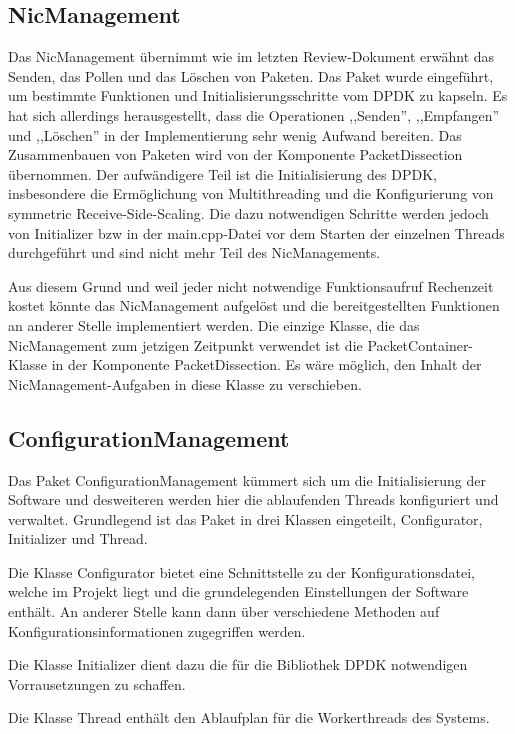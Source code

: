 \documentclass[../review_2.tex]{subfiles}
\begin{document}
\subsection{NicManagement}
Das NicManagement übernimmt wie im letzten Review-Dokument erwähnt das Senden, das Pollen und das Löschen von Paketen. Das Paket wurde eingeführt, um bestimmte Funktionen und Initialisierungsschritte vom DPDK zu kapseln. Es hat sich allerdings herausgestellt, dass die Operationen ,,Senden'', ,,Empfangen'' und ,,Löschen'' in der Implementierung sehr wenig Aufwand bereiten. Das Zusammenbauen von Paketen wird von der Komponente PacketDissection übernommen. Der aufwändigere Teil ist die Initialisierung des DPDK, insbesondere die Ermöglichung von Multithreading und die Konfigurierung von symmetric Receive-Side-Scaling. Die dazu notwendigen Schritte werden jedoch von Initializer bzw in der main.cpp-Datei vor dem Starten der einzelnen Threads durchgeführt und sind nicht mehr Teil des NicManagements.

Aus diesem Grund und weil jeder nicht notwendige Funktionsaufruf Rechenzeit kostet könnte das NicManagement aufgelöst und die bereitgestellten Funktionen an anderer Stelle implementiert werden. Die einzige Klasse, die das NicManagement zum jetzigen Zeitpunkt verwendet ist die PacketContainer-Klasse in der Komponente PacketDissection. Es wäre möglich, den Inhalt der NicManagement-Aufgaben in diese Klasse zu verschieben.


\subsection{ConfigurationManagement}
Das Paket \glqq ConfigurationManagement \grqq{} kümmert sich um die Initialisierung der Software und desweiteren werden hier die ablaufenden Threads konfiguriert und verwaltet. Grundlegend ist das Paket in drei Klassen eingeteilt, Configurator, Initializer und Thread. 

Die Klasse \glqq Configurator\grqq{} bietet eine Schnittstelle zu der Konfigurationsdatei, welche im Projekt liegt und die grundelegenden Einstellungen der Software enthält. An anderer Stelle kann dann über verschiedene Methoden auf Konfigurationsinformationen zugegriffen werden.

Die Klasse \glqq Initializer\grqq{} dient dazu die für die Bibliothek DPDK notwendigen Vorrausetzungen zu schaffen.

Die Klasse \glqq Thread\grqq{} enthält den Ablaufplan für die Workerthreads des Systems. 
\end{document}
